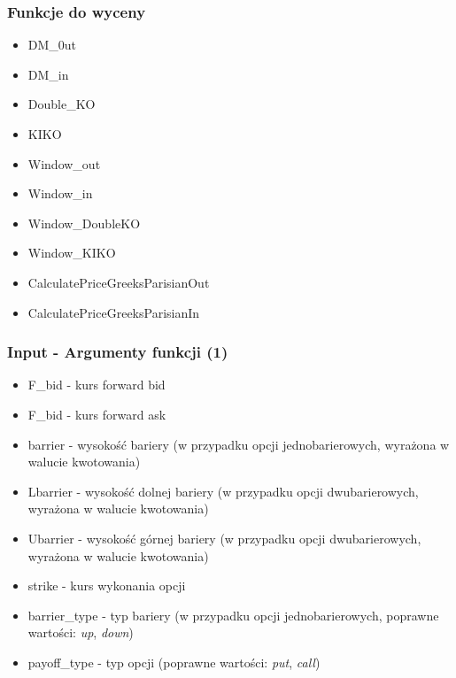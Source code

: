 \documentclass{beamer}
\begin{document}
\begin{frame}
  \frametitle{Funkcje do wyceny}
\begin{itemize}
  
\item{DM\_0ut}

\item{DM\_in}

\item{Double\_KO}

\item{KIKO}

\item{Window\_out}

\item{Window\_in}

\item{Window\_DoubleKO}

\item{Window\_KIKO}
\item{CalculatePriceGreeksParisianOut}

\item{CalculatePriceGreeksParisianIn}
  \end{itemize}
\end{frame}

\begin{frame}
  \frametitle{Input - Argumenty funkcji (1)}
\begin{itemize}
\item F\_bid - kurs forward bid
\item F\_bid - kurs forward ask
\item barrier - wysokość bariery (w przypadku opcji jednobarierowych, wyrażona w walucie kwotowania)
\item Lbarrier - wysokość dolnej bariery (w przypadku opcji dwubarierowych, wyrażona w walucie kwotowania)
\item Ubarrier - wysokość górnej bariery (w przypadku opcji dwubarierowych, wyrażona w walucie kwotowania)
\item strike - kurs wykonania opcji
\item barrier\_type - typ bariery (w przypadku opcji jednobarierowych, poprawne wartości: \emph{up}, \emph{down})
\item payoff\_type - typ opcji (poprawne wartości: \emph{put}, \emph{call})
\end{itemize}

\end{frame}
\end{document}
